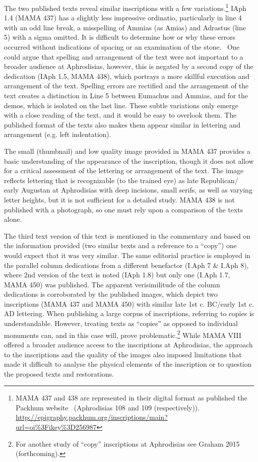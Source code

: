 \documentclass[amsthm,ebook]{saparticle}
\begin{document}
The two published texts reveal similar inscriptions with a few variations.\footnote{ MAMA 437 and 438 are represented in
their digital format as published the Packhum website \ (Aphrodisias 108 and 109 (respectively)).
\url{http://epigraphy.packhum.org/inscriptions/main?url=oi\%3Fikey\%3D256987}} IAph 1.4 (MAMA 437) has a slightly less
impressive ordinatio, particularly in line 4 with an odd line break, a misspelling of Ammias (as Amias) and Adrastus
(line 5) with a sigma omitted. It is difficult to determine how or why these errors occurred without indications of
spacing or an examination of the stone. \ One could argue that spelling and arrangement of the text were not important
to a broader audience at Aphrodisias, however, this is negated by a second copy of the dedication (IAph 1.5, MAMA 438),
which portrays a more skillful execution and arrangement of the text. Spelling errors are rectified and the arrangement
of the text creates a distinction in Line 5 between Eumachus and Ammias, and for the demos, which is isolated on the
last line. These subtle variations only emerge with a close reading of the text, and it would be easy to overlook them.
The published format of the texts also makes them appear similar in lettering and arrangement (e.g. left indentation).





The small (thumbnail) and low quality image provided in MAMA 437 provides a basic understanding of the appearance of the
inscription, though it does not allow for a critical assessment of the lettering or arrangement of the text. The image
reflects lettering that is recognizable (to the trained eye) as late Republican/ early Augustan at Aphrodisias with
deep incisions, small serifs, as well as varying letter heights, but it is not sufficient for a detailed study. MAMA
438 is not published with a photograph, so one must rely upon a comparison of the texts alone.




The third text version of this text is mentioned in the commentary and based on the information provided (two similar
texts and a reference to a ``copy'') one would expect that it was very similar. The same editorial practice is employed
in the parallel column dedications from a different benefactor (I.Aph 7 \& I.Aph 8), where 2nd version of the text is
noted (IAph 1.8) but only one (I.Aph 1.7, MAMA 450) was published. The apparent verisimilitude of the column
dedications is corroborated by the published images, which depict two inscriptions (MAMA 437 and MAMA 450) with similar
late 1st c. BC/early 1st c. AD lettering. When publishing a large corpus of inscriptions, referring to copies is
understandable. However, treating texts as ``copies'' as opposed to individual monuments can, and in this case will,
prove problematic.\footnote{ For another study of ``copy'' inscriptions at Aphrodisias see Graham 2015 (forthcoming).}
While MAMA VIII offered a broader audience access to the inscriptions at Aphrodisias, the approach to the inscriptions
and the quality of the images also imposed limitations that made it difficult to analyse the physical elements of the
inscription or to question the proposed texts and restorations. 
\end{document}
